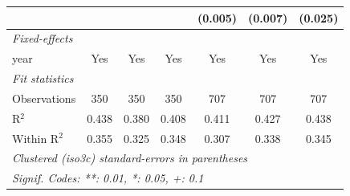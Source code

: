\begin{tabular}{lcccccc}
                                          &                                             &                           &                               & (0.005)                                     & (0.007)                   & (0.025)\\   
   \midrule
   \emph{Fixed-effects}\\
   year                                   & Yes                                         & Yes                       & Yes                           & Yes                                         & Yes                       & Yes\\  
   \midrule
   \emph{Fit statistics}\\
   Observations                           & 350                                         & 350                       & 350                           & 707                                         & 707                       & 707\\  
   R$^2$                                  & 0.438                                       & 0.380                     & 0.408                         & 0.411                                       & 0.427                     & 0.438\\  
   Within R$^2$                           & 0.355                                       & 0.325                     & 0.348                         & 0.307                                       & 0.338                     & 0.345\\  
   \midrule \midrule
   \multicolumn{7}{l}{\emph{Clustered (iso3c) standard-errors in parentheses}}\\
   \multicolumn{7}{l}{\emph{Signif. Codes: **: 0.01, *: 0.05, +: 0.1}}\\
\end{tabular}
\par\endgroup


